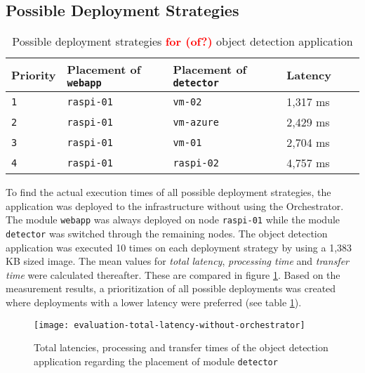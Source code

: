 \clearpage
\subsection{Possible Deployment Strategies\label{sec:eval-possible-deployments}}

\begin{table}[h!]
    \centering
    \begin{tabular}{|l|l|l|l|l|l|}
    \hline
        \textbf{Priority} & \textbf{Placement of \texttt{webapp}} & \textbf{Placement of \texttt{detector}} & \textbf{Latency} \\
         \hline
         \texttt{1} & \texttt{raspi-01} & \texttt{vm-02} & 1,317 ms\\
         \hline
         \texttt{2} & \texttt{raspi-01} & \texttt{vm-azure} & 2,429 ms\\
         \hline
         \texttt{3} & \texttt{raspi-01} & \texttt{vm-01} & 2,704 ms\\
         \hline
         \texttt{4} & \texttt{raspi-01} & \texttt{raspi-02} & 4,757 ms\\
         \hline
    \end{tabular}
    \caption{Possible deployment strategies \textcolor{red}{\textbf{for (of?)}} object detection application}
    \label{tab:deployment-strategies-prios}
\end{table}

To find the actual execution times of all possible deployment strategies, the application was deployed to the infrastructure without using the Orchestrator.
The module \texttt{webapp} was always deployed on node \texttt{raspi-01} while the module \texttt{detector} was switched through the remaining nodes.
The object detection application was executed 10 times on each deployment strategy by using a 1,383 KB sized image.
The mean values for \textit{total latency}, \textit{processing time} and \textit{transfer time} were calculated thereafter. These are compared in figure \ref{fig:evaluation-total-latency-without-orchestrator}.
Based on the measurement results, a prioritization of all possible deployments was created where deployments with a lower latency were preferred (see table \ref{tab:deployment-strategies-prios}).

\begin{figure}[h!]
    \centering
    \texttt{[image: evaluation-total-latency-without-orchestrator]}
    \caption{Total latencies, processing and transfer times of the object detection application regarding the placement of module \texttt{detector}}
    \label{fig:evaluation-total-latency-without-orchestrator}
\end{figure}



